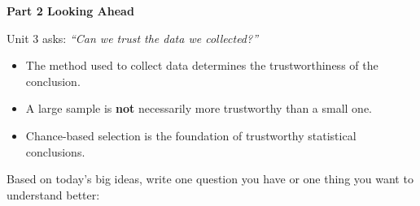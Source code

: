 \documentclass[10pt]{article}
\begin{document}
{\large\bfseries\color{navy} Part 2 \quad Looking Ahead}

\vspace{0.12in}

\noindent Unit 3 asks: \textit{``Can we trust the data we collected?''}

\vspace{0.14in}

\begin{tcolorbox}[colback=greenbg, colframe=greenacc, boxrule=0.8pt, arc=2mm,
    left=4mm, right=4mm, top=3mm, bottom=3mm]
    \small
    \begin{itemize}[leftmargin=1.3em, itemsep=8pt]
  \item The method used to collect data determines the trustworthiness of the conclusion.
  \item A large sample is \textbf{not} necessarily more trustworthy than a small one.
  \item Chance-based selection is the foundation of trustworthy statistical conclusions.
    \end{itemize}
\end{tcolorbox}

\vspace{0.2in}

\noindent\textcolor{slate}{\small Based on today's big ideas, write one question you have
or one thing you want to understand better:}\\[8pt]
\writeline\\[2pt]\writeline
\end{document}

